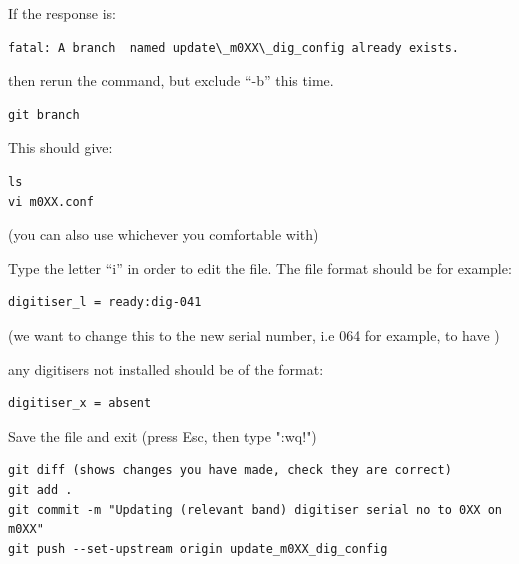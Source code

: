 If the response is:
\begin{lstlisting}[style=DOS]
fatal: A branch  named update\_m0XX\_dig_config already exists.
\end{lstlisting}
then rerun the command, but exclude “-b” this time.
\begin{lstlisting}[style=DOS]
git branch
\end{lstlisting}
 This should give:  
\begin{lstlisting}[style=DOS]
ls
vi m0XX.conf 
\end{lstlisting}
(you can also use  whichever you comfortable with)

Type the letter “i” in order to edit the file.
The file format should be for example:
\begin{lstlisting}[style=DOS]
digitiser_l = ready:dig-041
\end{lstlisting} 
(we want to change this to the new serial number, i.e 064 for
example, to have )


any digitisers not installed should be of the format: 
\begin{lstlisting}[style=DOS]
digitiser_x = absent
\end{lstlisting}
Save the file and exit (press Esc, then type ":wq!")

\begin{lstlisting}[style=DOS]
git diff (shows changes you have made, check they are correct)
git add .
git commit -m "Updating (relevant band) digitiser serial no to 0XX on
m0XX"
git push --set-upstream origin update_m0XX_dig_config
\end{lstlisting}
